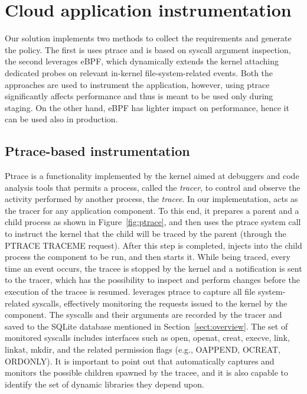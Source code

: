 \section{Cloud application instrumentation}\label{sect:cloud-instrum}

Our solution implements two methods to collect the requirements and
generate the policy. The first is uses ptrace and is based on syscall
argument inspection, the second leverages eBPF, which dynamically
extends the kernel attaching dedicated probes on relevant
\mbox{in-kernel} file-system-related events. Both the approaches are
used to instrument the application, however, using ptrace
significantly affects performance and thus is meant to be used only
during staging. On the other hand, eBPF has lighter impact on
performance, hence it can be used also in production.

\subsection{Ptrace-based instrumentation}\label{sect:deep-instr}

Ptrace is a functionality implemented by the kernel aimed at debuggers
and code analysis tools that permits a process, called the {\em
  tracer}, to control and observe the activity performed by another
process, the {\em tracee}. In our implementation, \dmng acts as the
tracer for any application component. To this end, it prepares a
parent and a child process as shown in Figure~\ref{fig:ptrace}, and
then uses the ptrace system call to instruct the kernel that the child
will be traced by the parent (through the PTRACE\textunderscore
  TRACEME request). After this step is completed, \dmng injects into
the child process the component to be run, and then starts it.  While
being traced, every time an event occurs, the tracee is stopped by the
kernel and a notification is sent to the tracer, which has the
possibility to inspect and perform changes before the execution of the
tracee is resumed.  \dmng leverages ptrace to capture all file
system-related syscalls, effectively monitoring the requests issued to
the kernel by the component. The syscalls and their arguments are
recorded by the tracer and saved to the SQLite database mentioned in
Section~\ref{sect:overview}. The set of monitored syscalls includes
interfaces such as open, openat, creat, execve, link, linkat, mkdir,
and the related permission flags (e.g., O\textunderscore APPEND,
O\textunderscore CREAT, O\textunderscore RDONLY). It is
important to point out that \dmng automatically captures and monitors
the possible children spawned by the tracee, and it is also capable to
identify the set of dynamic libraries they depend upon.

